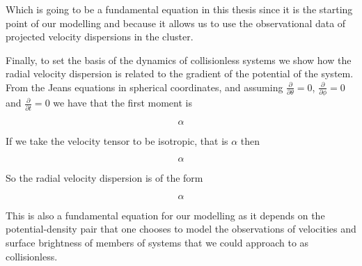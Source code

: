 Which is going to be a fundamental equation in this thesis since it is the starting point of our modelling and because it allows us to use the observational data of projected velocity dispersions in the cluster.  

Finally, to set the basis of the dynamics of collisionless systems we show how the radial velocity dispersion is related to the gradient of the potential of the system. From the Jeans equations in spherical coordinates, and assuming $\frac{\partial}{\partial \theta}=0$, $\frac{\partial}{\partial \phi}=0$ and $\frac{\partial}{\partial t}=0$ we have that the first moment is

\begin{equation}
\alpha
\end{equation}

If we take the velocity tensor to be isotropic, that is $\alpha $ then

\begin{equation}
\alpha
\end{equation}

So the radial velocity dispersion is of the form

\begin{equation}
\alpha
\end{equation}

This is also a fundamental equation for our modelling as it depends on the potential-density pair that one chooses to model the observations of velocities and surface brightness of members of systems that we could approach to as collisionless.